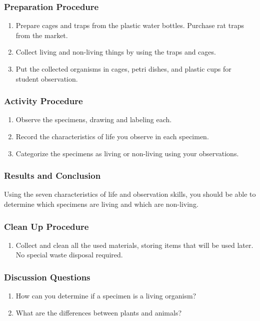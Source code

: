 \subsubsection*{Preparation Procedure}
\begin{enumerate}
\item{Prepare cages and traps from the plastic water bottles. Purchase rat traps from the market.}
\item{Collect living and non-living things by using the traps and cages.}
\item{Put the collected organisms in cages, petri dishes, and plastic cups for student observation.}
\end{enumerate}

\subsubsection*{Activity Procedure}
\begin{enumerate}
\item{Observe the specimens, drawing and labeling each.}
\item{Record the characteristics of life you observe in each specimen.}
\item{Categorize the specimens as living or non-living using your observations.}
\end{enumerate}

\subsubsection*{Results and Conclusion}
Using the seven characteristics of life and observation skills, you should be able to determine which specimens are living and which are non-living.

\subsubsection*{Clean Up Procedure}
\begin{enumerate}
\item{Collect and clean all the used materials, storing items that will be used later. No special waste disposal required.}
\end{enumerate}

\subsubsection*{Discussion Questions}
\begin{enumerate}
\item{How can you determine if a specimen is a living organism?}
\item{What are the differences between plants and animals?}
\end{enumerate}

